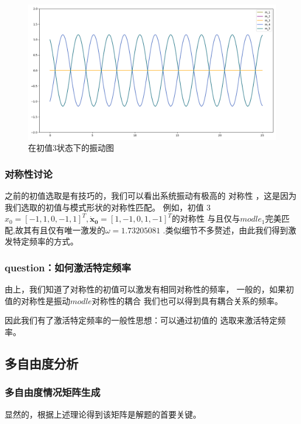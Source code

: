\documentclass[11pt, a4paper, oneside]{ctexart}
\begin{document}
{{{    \begin{figure}[H]
        
        \centering
        \vspace{2mm}
        \includegraphics[scale=0.4]{1,-1,0,1,-1.png}
        \caption{在初值3状态下的振动图 }
    \end{figure} 
    

\subsubsection{对称性讨论}

之前的初值选取是有技巧的，我们可以看出系统振动有极高的
对称性
，这是因为我们选取的初值与模式形状的对称性匹配。
例如，初值 3${x_0}=[-1,1,0,-1,1]^T,
\boldsymbol{\dot x_0}=[1,-1,0,1,-1]^T
$的对称性
与且仅与$modle_1$完美匹配,故其有且仅有唯一激发的$\omega=1.73205081$
.类似细节不多赘述，由此我们得到激发特定频率的方式。
\subsubsection{question：如何激活特定频率}

由上，我们知道了对称性的初值可以激发有相同对称性的频率，
一般的，如果初值的对称性是振动$modle$对称性的耦合
我们也可以得到具有耦合关系的频率。

因此我们有了激活特定频率的一般性思想：可以通过初值的
选取来激活特定频率。
\subsection{多自由度分析}
\subsubsection{多自由度情况矩阵生成}
显然的，根据上述理论得到该矩阵是解题的首要关键。

}}}
\end{document}

